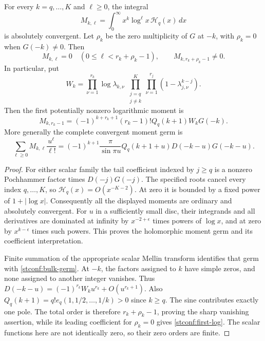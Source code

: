 \begin{theorem}
\label{stconf:blocks}
For every $k=q,\ldots,K$ and $\ell\ge0$, the integral
\[
 M_{k,\ell}=\int_0^\infty x^k\log^\ell x\,\mathcal H_q(x)\,dx
\]
is absolutely convergent. Let $\rho_k$ be the zero multiplicity of
$G$ at $-k$, with $\rho_k=0$ when $G(-k)\ne0$. Then
\begin{equation}\label{stconf:vanishing-order}
 M_{k,\ell}=0\quad(0\le\ell<r_k+\rho_k-1),\qquad
 M_{k,r_k+\rho_k-1}\ne0.
\end{equation}
In particular, put
\[
 W_k=\prod_{\nu=1}^{r_k}\log\lambda_{k,\nu}\;
      \prod_{\substack{j=q\\j\ne k}}^K
            \prod_{\nu=1}^{r_j}(1-\lambda_{j,\nu}^{k-j}).
\]
Then the first potentially nonzero logarithmic moment is
\begin{equation}\label{stconf:first-log}
 M_{k,r_k-1}
   =(-1)^{k+r_k+1}(r_k-1)!Q_q(k+1)W_kG(-k).
\end{equation}
More generally the complete convergent moment germ is
\begin{equation}\label{stconf:bulk-germ}
 \sum_{\ell\ge0}M_{k,\ell}\frac{u^\ell}{\ell!}
  =(-1)^{k+1}\frac\pi{\sin\pi u}
       Q_q(k+1+u)D(-k-u)G(-k-u).
\end{equation}
\end{theorem}
\begin{proof}
For either scalar family the tail coefficient indexed by $j\ge q$
is a nonzero Pochhammer factor times $D(-j)G(-j)$. The specified
roots cancel every index $q,\ldots,K$, so
$\mathcal H_q(x)=O(x^{-K-2})$. At zero it is bounded by a fixed
power of $1+|\log x|$. Consequently all the displayed moments are
ordinary and absolutely convergent. For $u$ in a sufficiently small
disc, their integrands and all derivatives are dominated at infinity
by $x^{-2+\epsilon}$ times powers of $\log x$, and at zero by
$x^{k-\epsilon}$ times such powers. This proves the holomorphic
moment germ and its coefficient interpretation.

Finite summation of the appropriate scalar Mellin transform identifies
that germ with \eqref{stconf:bulk-germ}. At $-k$, the factors assigned
to $k$ have simple zeros, and none assigned to another integer vanishes.
Thus $D(-k-u)=(-1)^{r_k}W_ku^{r_k}+O(u^{r_k+1})$.
Also $Q_q(k+1)=q!e_q(1,1/2,\ldots,1/k)>0$ since $k\ge q$.
The sine contributes exactly one pole. The total order is therefore
$r_k+\rho_k-1$, proving the sharp vanishing assertion, while its
leading coefficient for $\rho_k=0$ gives \eqref{stconf:first-log}.
The scalar functions here are not identically zero, so their zero
orders are finite.
\end{proof}

